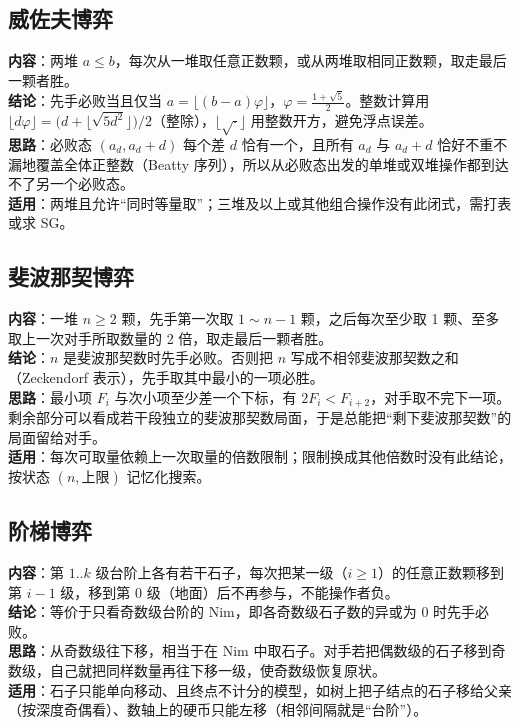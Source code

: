 \subsection{威佐夫博弈}\label{knowledge-game-wythoff}
\textbf{内容}：两堆 $a\le b$，每次从一堆取任意正数颗，或从两堆取相同正数颗，取走最后一颗者胜。\\
\textbf{结论}：先手必败当且仅当 $a=\lfloor (b-a)\varphi\rfloor$，$\varphi=\frac{1+\sqrt5}{2}$。整数计算用 $\lfloor d\varphi\rfloor=\bigl(d+\lfloor\sqrt{5d^2}\rfloor\bigr)/2$（整除），$\lfloor\sqrt{\cdot}\rfloor$ 用整数开方，避免浮点误差。\\
\textbf{思路}：必败态 $(a_d,a_d+d)$ 每个差 $d$ 恰有一个，且所有 $a_d$ 与 $a_d+d$ 恰好不重不漏地覆盖全体正整数（Beatty 序列），所以从必败态出发的单堆或双堆操作都到达不了另一个必败态。\\
\textbf{适用}：两堆且允许“同时等量取”；三堆及以上或其他组合操作没有此闭式，需打表或求 SG。



\subsection{斐波那契博弈}\label{knowledge-game-fibonacci}
\textbf{内容}：一堆 $n\ge2$ 颗，先手第一次取 $1\sim n-1$ 颗，之后每次至少取 1 颗、至多取上一次对手所取数量的 2 倍，取走最后一颗者胜。\\
\textbf{结论}：$n$ 是斐波那契数时先手必败。否则把 $n$ 写成不相邻斐波那契数之和（Zeckendorf 表示），先手取其中最小的一项必胜。\\
\textbf{思路}：最小项 $F_i$ 与次小项至少差一个下标，有 $2F_i<F_{i+2}$，对手取不完下一项。剩余部分可以看成若干段独立的斐波那契数局面，于是总能把“剩下斐波那契数”的局面留给对手。\\
\textbf{适用}：每次可取量依赖上一次取量的倍数限制；限制换成其他倍数时没有此结论，按状态 $(n,\text{上限})$ 记忆化搜索。



\subsection{阶梯博弈}\label{knowledge-game-staircase}
\textbf{内容}：第 $1..k$ 级台阶上各有若干石子，每次把某一级（$i\ge1$）的任意正数颗移到第 $i-1$ 级，移到第 $0$ 级（地面）后不再参与，不能操作者负。\\
\textbf{结论}：等价于只看奇数级台阶的 Nim，即各奇数级石子数的异或为 $0$ 时先手必败。\\
\textbf{思路}：从奇数级往下移，相当于在 Nim 中取石子。对手若把偶数级的石子移到奇数级，自己就把同样数量再往下移一级，使奇数级恢复原状。\\
\textbf{适用}：石子只能单向移动、且终点不计分的模型，如树上把子结点的石子移给父亲（按深度奇偶看）、数轴上的硬币只能左移（相邻间隔就是“台阶”）。



